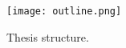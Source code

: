 \clearpage

\begin{figure}[tb]
	\begin{center}
		\texttt{[image: outline.png]}
		\caption[Thesis structure]{Thesis structure.}
		\label{fig:outline}
	\end{center}
\end{figure}
\clearpage







